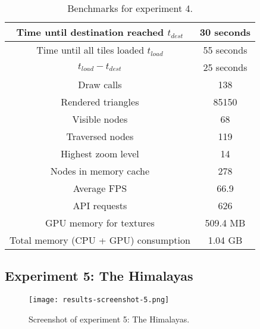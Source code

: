 \begin{table}[H]
  \begin{center}
    \begin{tabular}{ c|c }
      Time until destination reached $t_{dest}$ & 30 seconds \\
      \hline
      Time until all tiles loaded $t_{load}$ & 55 seconds \\
      \hline
      $t_{load} - t_{dest}$ & 25 seconds \\
      \hline
      Draw calls & 138 \\
      \hline
      Rendered triangles & 85150 \\
      \hline
      Visible nodes & 68 \\
      \hline
      Traversed nodes & 119 \\
      \hline
      Highest zoom level & 14 \\
      \hline
      Nodes in memory cache & 278 \\
      \hline
      Average FPS & 66.9 \\
      \hline 
      API requests & 626 \\
      \hline
      GPU memory for textures & 509.4 MB \\
      \hline
      Total memory (CPU + GPU) consumption & 1.04 GB \\
    \end{tabular}
  \end{center}
  \caption{Benchmarks for experiment 4.}\label{tbl:results-4}
  \end{table}

\subsection{Experiment 5: The Himalayas}
\begin{figure}[H]
  \centering
  \texttt{[image: results-screenshot-5.png]}
  \caption{Screenshot of experiment 5: The Himalayas.}\label{fig:results-screenshot-5}
\end{figure}

